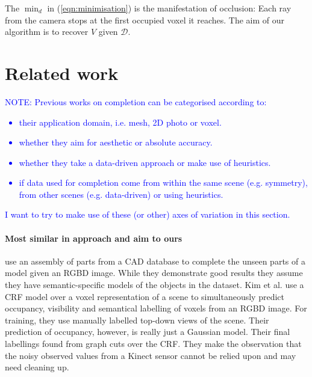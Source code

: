 \documentclass[10pt,twocolumn,letterpaper]{article}
\makeatletter
\renewcommand*{\eg}{e.g.\@\xspace}
\renewcommand*{\ie}{i.e.\@\xspace}
\newcommand*{\ea}{et al.\@\xspace}
\newcommand{\rgbdimage}{\mathcal{D}}
\newcommand{\note}[1]{\textcolor{blue}{NOTE: #1}}
\makeatother
\begin{document}
The $\min_d$ in (\ref{eqn:minimisation}) is the manifestation of occlusion: Each ray from the camera stops at the first occupied voxel it reaches.
The aim of our algorithm is to recover $V$ given $\rgbdimage$.


\section{Related work}




\note{
Previous works on completion can be categorised according to:
\begin{itemize}
\item their application domain, \ie mesh, 2D photo or voxel. 
\item whether they aim for aesthetic or absolute accuracy.
\item whether they take a data-driven approach or make use of heuristics.
\item if data used for completion come from within the same scene (\eg symmetry), from other scenes (\eg data-driven) or using heuristics.
\end{itemize}
I want to try to make use of these (or other) axes of variation in this section.
}

\paragraph{Most similar in approach and aim to ours}
\cite{shen-tog-2012} use an assembly of parts from a CAD database to complete the unseen parts of a model given an RGBD image. 
While they demonstrate good results they assume they have semantic-specific models of the objects in the dataset.
Kim \ea \cite{kim-iccv-2013} use a CRF model over a voxel representation of a scene to simultaneously predict occupancy, visibility and semantical labelling of voxels from an RGBD image. 
For training, they use manually labelled top-down views of the scene. 
Their prediction of occupancy, however, is really just a Gaussian model. 
Their final labellings found from graph cuts over the CRF. 
They make the observation that the noisy observed values from a Kinect sensor cannot be relied upon and may need cleaning up.
\end{document}
